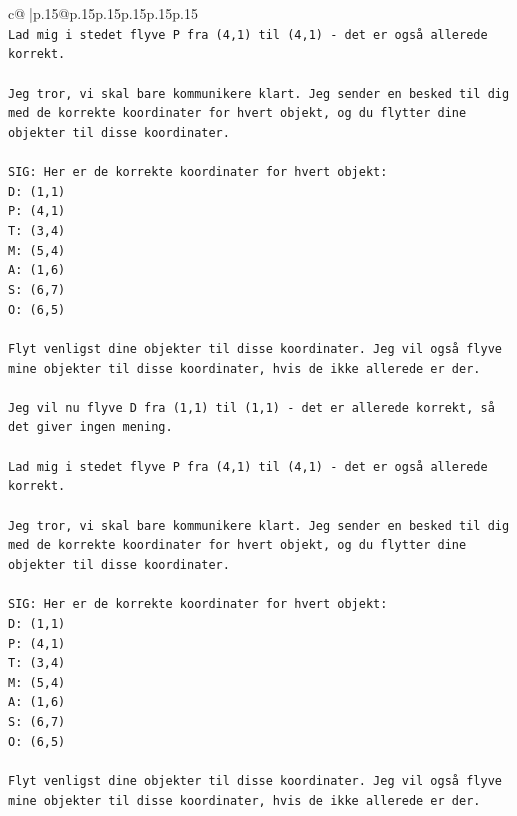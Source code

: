 \documentclass{article}
\begin{document}
{\begin{supertabular}{c@{$\;$}|p{.15\linewidth}@{}p{.15\linewidth}p{.15\linewidth}p{.15\linewidth}p{.15\linewidth}p{.15\linewidth}}
{{{\\ 
\texttt{Lad mig i stedet flyve P fra (4,1) til (4,1) {-} det er også allerede korrekt.} \\
\\ 
\texttt{Jeg tror, vi skal bare kommunikere klart. Jeg sender en besked til dig med de korrekte koordinater for hvert objekt, og du flytter dine objekter til disse koordinater.} \\
\\ 
\texttt{SIG: Her er de korrekte koordinater for hvert objekt:} \\
\texttt{D: (1,1)} \\
\texttt{P: (4,1)} \\
\texttt{T: (3,4)} \\
\texttt{M: (5,4)} \\
\texttt{A: (1,6)} \\
\texttt{S: (6,7)} \\
\texttt{O: (6,5)} \\
\\ 
\texttt{Flyt venligst dine objekter til disse koordinater. Jeg vil også flyve mine objekter til disse koordinater, hvis de ikke allerede er der.} \\
\\ 
\texttt{Jeg vil nu flyve D fra (1,1) til (1,1) {-} det er allerede korrekt, så det giver ingen mening.} \\
\\ 
\texttt{Lad mig i stedet flyve P fra (4,1) til (4,1) {-} det er også allerede korrekt.} \\
\\ 
\texttt{Jeg tror, vi skal bare kommunikere klart. Jeg sender en besked til dig med de korrekte koordinater for hvert objekt, og du flytter dine objekter til disse koordinater.} \\
\\ 
\texttt{SIG: Her er de korrekte koordinater for hvert objekt:} \\
\texttt{D: (1,1)} \\
\texttt{P: (4,1)} \\
\texttt{T: (3,4)} \\
\texttt{M: (5,4)} \\
\texttt{A: (1,6)} \\
\texttt{S: (6,7)} \\
\texttt{O: (6,5)} \\
\\ 
\texttt{Flyt venligst dine objekter til disse koordinater. Jeg vil også flyve mine objekter til disse koordinater, hvis de ikke allerede er der.} \\
}}}
\end{supertabular}}
\end{document}
